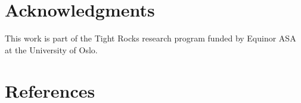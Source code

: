 \documentclass[12pt,a4paper,final]{iopart}
\begin{document}
\section{Acknowledgments}
This work is part of the Tight Rocks research program funded by Equinor ASA at the University of Oslo.

\section*{References}

%
\end{document}
